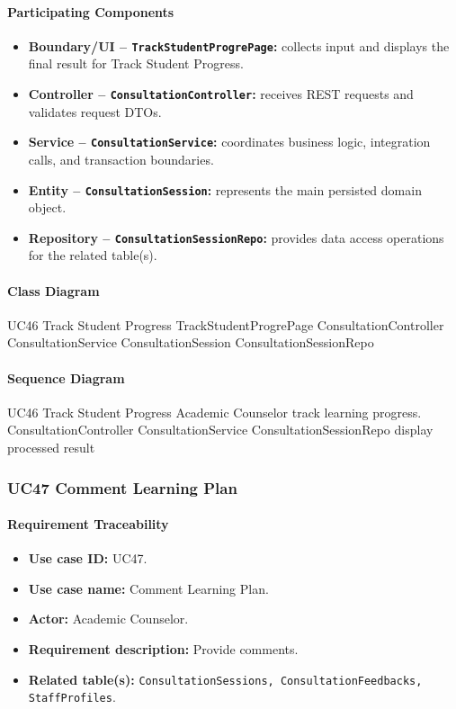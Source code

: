 \paragraph{Participating Components}

\begin{itemize}
    \item \textbf{Boundary/UI -- \texttt{TrackStudentProgrePage}:} collects input and displays the final result for Track Student Progress.
    \item \textbf{Controller -- \texttt{ConsultationController}:} receives REST requests and validates request DTOs.
    \item \textbf{Service -- \texttt{ConsultationService}:} coordinates business logic, integration calls, and transaction boundaries.
    \item \textbf{Entity -- \texttt{ConsultationSession}:} represents the main persisted domain object.
    \item \textbf{Repository -- \texttt{ConsultationSessionRepo}:} provides data access operations for the related table(s).
\end{itemize}

\paragraph{Class Diagram}

\ClassDiagram
{UC46 Track Student Progress}
{TrackStudentProgrePage}
{ConsultationController}
{ConsultationService}
{ConsultationSession}
{ConsultationSessionRepo}

\paragraph{Sequence Diagram}

\SequenceDiagram
{UC46 Track Student Progress}
{Academic Counselor}
{track learning progress.}
{ConsultationController}
{ConsultationService}
{ConsultationSessionRepo}
{display processed result}

\subsubsection{UC47 Comment Learning Plan}

\paragraph{Requirement Traceability}

\begin{itemize}
    \item \textbf{Use case ID:} UC47.
    \item \textbf{Use case name:} Comment Learning Plan.
    \item \textbf{Actor:} Academic Counselor.
    \item \textbf{Requirement description:} Provide comments.
    \item \textbf{Related table(s):} \texttt{ConsultationSessions, ConsultationFeedbacks, StaffProfiles}.
\end{itemize}

